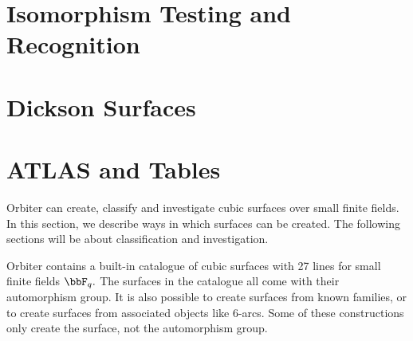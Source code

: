 \bigskip

\clearpage


\section{Isomorphism Testing and Recognition}
\label{sec:cubicsurfaces:iso:rec}




\bigskip

\clearpage


\section{Dickson Surfaces}
\label{sec:cubicsurfaces:Dickson}




\bigskip

\clearpage


\section{ATLAS and Tables}
\label{sec:cubicsurfaces:ATLAS}




\bigskip

\clearpage
Orbiter can create, classify and investigate cubic surfaces over small finite fields. 
In this section, we describe ways in which surfaces can be created. 
The following sections will be about classification and investigation.

\bigskip

Orbiter contains a built-in catalogue of cubic surfaces with 27 
lines for small finite fields $\bbF_q.$ 
The surfaces in the catalogue all come with their automorphism group.
It is also possible to create surfaces from known families, 
or to create surfaces from associated objects like 6-arcs. 
Some of these constructions only create the surface, 
not the automorphism group.

\bigskip

